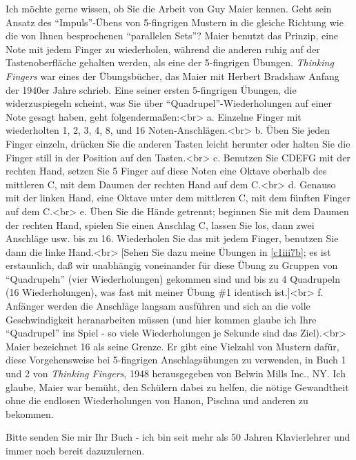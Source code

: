 \item \label{testimonials04}
Ich möchte gerne wissen, ob Sie die Arbeit von Guy Maier kennen.
Geht sein Ansatz des \enquote{Impuls}-Übens von 5-fingrigen Mustern in die gleiche Richtung wie die von Ihnen besprochenen \enquote{parallelen Sets}?
Maier benutzt das Prinzip, eine Note mit jedem Finger zu wiederholen, während die anderen ruhig auf der Tastenoberfläche gehalten werden, als eine der 5-fingrigen Übungen.
\textit{Thinking Fingers} war eines der Übungsbücher, das Maier mit Herbert Bradshaw Anfang der 1940er Jahre schrieb.
Eine seiner ersten 5-fingrigen Übungen, die widerzuspiegeln scheint, was Sie über \enquote{Quadrupel}-Wiederholungen auf einer Note gesagt haben, geht folgendermaßen:<br>
a. Einzelne Finger mit wiederholten 1, 2, 3, 4, 8, und 16 Noten-Anschlägen.<br>
b. Üben Sie jeden Finger einzeln, drücken Sie die anderen Tasten leicht herunter oder halten Sie die Finger still in der Position auf den Tasten.<br>
c. Benutzen Sie CDEFG mit der rechten Hand, setzen Sie 5 Finger auf diese Noten eine Oktave oberhalb des mittleren C, mit dem Daumen der rechten Hand auf dem C.<br>
d. Genauso mit der linken Hand, eine Oktave unter dem mittleren C, mit dem fünften Finger auf dem C.<br>
e. Üben Sie die Hände getrennt; beginnen Sie mit dem Daumen der rechten Hand, spielen Sie einen Anschlag C, lassen Sie los, dann zwei Anschläge usw. bis zu 16.
Wiederholen Sie das mit jedem Finger, benutzen Sie dann die linke Hand.<br>
[Sehen Sie dazu meine Übungen in \hyperref[c1iii7b]{\autoref{c1iii7b}}; es ist erstaunlich, daß wir unabhängig voneinander für diese Übung zu Gruppen von \enquote{Quadrupeln} (vier Wiederholungen) gekommen sind und bis zu 4 Quadrupeln (16 Wiederholungen), was fast mit meiner Übung \#1 identisch ist.]<br>
f. Anfänger werden die Anschläge langsam ausführen und sich an die volle Geschwindigkeit heranarbeiten müssen (und hier kommen glaube ich Ihre \enquote{Quadrupel} ins Spiel - so viele Wiederholungen je Sekunde sind das Ziel).<br> Maier bezeichnet 16 als seine Grenze.
Er gibt eine Vielzahl von Mustern dafür, diese Vorgehensweise bei 5-fingrigen Anschlagsübungen zu verwenden, in Buch 1 und 2 von \textit{Thinking Fingers}, 1948 herausgegeben von Belwin Mills Inc., NY.
Ich glaube, Maier war bemüht, den Schülern dabei zu helfen, die nötige Gewandtheit ohne die endlosen Wiederholungen von Hanon, Pischna und anderen zu bekommen.


\item \label{testimonials05}
Bitte senden Sie mir Ihr Buch - ich bin seit mehr als 50 Jahren Klavierlehrer und immer noch bereit dazuzulernen.


